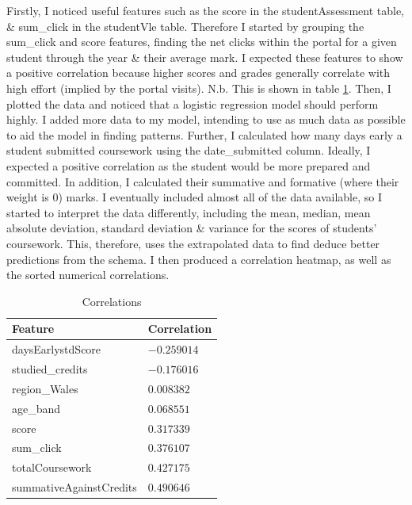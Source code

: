 \documentclass[11pt, a4paper, twocolumn]{article}
\begin{document}
Firstly, I noticed useful features such as the score in the studentAssessment table, \& sum\_click in the studentVle table.
Therefore I started by grouping the sum\_click and score features, finding the net clicks within the portal for a given student through the year \& their average mark. 
I expected these features to show a positive correlation because higher scores and grades generally correlate with high effort (implied by the portal visits). N.b. This is shown in table \ref{table:Correlations}.
Then, I plotted the data and noticed that a logistic regression model should perform highly. 
I added more data to my model, intending to use as much data as possible to aid the model in finding patterns.
Further, I calculated how many days early a student submitted coursework using the date\_submitted column.
Ideally, I expected a positive correlation as the student would be more prepared and committed.
In addition, I calculated their summative and formative (where their weight is 0) marks. 
I eventually included almost all of the data available, so I started to interpret the data differently, including the mean, median, mean absolute deviation, standard deviation \& variance for the scores of students' coursework.
This, therefore, uses the extrapolated data to find deduce better predictions from the schema. 
I then produced a correlation heatmap, as well as the sorted numerical correlations.


\begin{table}[H]
	\centering
	\begin{tabular}{|l|l|}
		\hline
		Feature                    & Correlation \\ \hline
		daysEarlystdScore            & $-0.259014$ \\ \hline
		studied\_credits             & $-0.176016$ \\ \hline
		region\_Wales                & $0.008382$  \\ \hline
		age\_band                    & $0.068551$  \\ \hline
		score                        & $0.317339$  \\ \hline
		sum\_click                   & $0.376107$  \\ \hline
		totalCoursework              & $0.427175$  \\ \hline
		summativeAgainstCredits      & $0.490646$  \\ \hline
		\end{tabular}
		\caption{Correlations}
		\label{table:Correlations}
\end{table}
\end{document}

